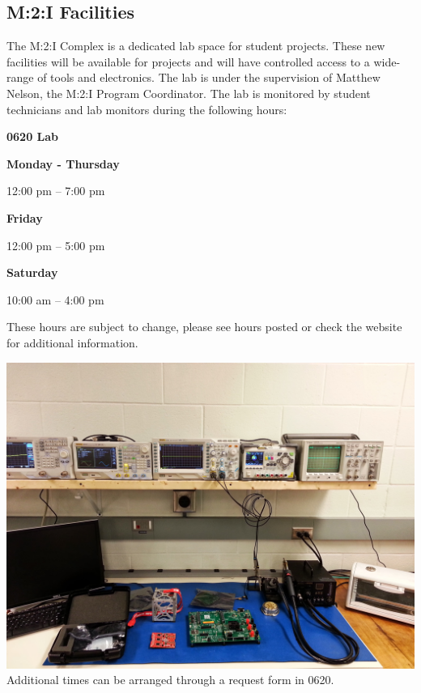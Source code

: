 \documentclass[10pt,foldmark,notumble]{leaflet}
\begin{document}
\subsection{M:2:I Facilities}
The M:2:I Complex is a dedicated lab space for student projects.  These new facilities will be available for projects and will have controlled access to a wide-range of tools and electronics.  The lab is under the supervision of Matthew Nelson, the M:2:I Program Coordinator.  The lab is monitored by student technicians and lab monitors during the following hours:

\begin{center}
\vspace{0.2cm}
{\large \bf 0620 Lab}

\vspace{0.2cm}
{\bf Monday - Thursday}

12:00 pm -- 7:00 pm

\vspace{0.2cm}
{\bf Friday}

12:00 pm -- 5:00 pm

\vspace{0.2cm}
{\bf Saturday}

10:00 am -- 4:00 pm

These hours are subject to change, please see hours posted or check the website for additional information.
\end{center}

\includegraphics[scale=.068]{images/0620elab.jpg}
Additional times can be arranged through a request form in 0620.
\end{document}
